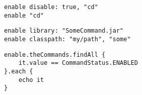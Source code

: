 \begin{lstlisting}[style=Groovybash, label={lst:example_enable1}, title={%
Disables and enables build-in commands.}]
enable disable: true, "cd"
enable "cd"
\end{lstlisting}

\begin{lstlisting}[style=Groovybash, label={lst:example_enable2}, title={%
Loads build-in commands from libraries.}]
enable library: "SomeCommand.jar"
enable classpath: "my/path", "some"
\end{lstlisting}

\begin{lstlisting}[style=Groovybash, label={lst:example_enable3}, title={%
Print all enabled build-in commands.}]
enable.theCommands.findAll { 
    it.value == CommandStatus.ENABLED 
}.each {
    echo it
}
\end{lstlisting}

